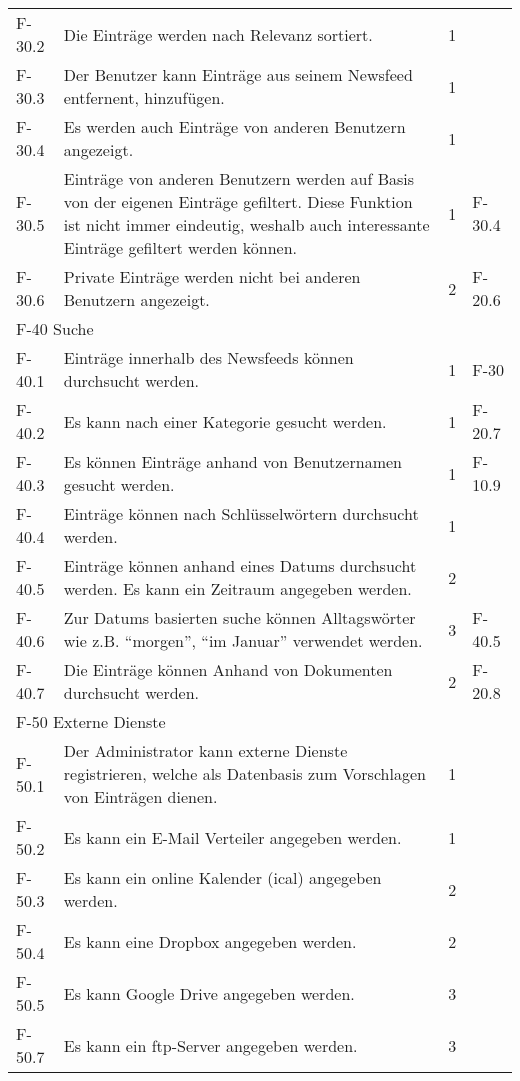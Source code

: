 \begin{tabularx}{\textwidth}{|l|X|l|l|}
    F-30.2 & Die Einträge werden nach Relevanz sortiert. & 1 & \\
    F-30.3 & Der Benutzer kann Einträge aus seinem Newsfeed entfernent, hinzufügen. & 1 & \\
    F-30.4 & Es werden auch Einträge von anderen Benutzern angezeigt. & 1 & \\
    F-30.5 & Einträge von anderen Benutzern werden auf Basis von der eigenen Einträge gefiltert. Diese Funktion ist nicht immer eindeutig, weshalb auch interessante Einträge gefiltert werden können. & 1 & F-30.4\\
    F-30.6 & Private Einträge werden nicht bei anderen Benutzern angezeigt. & 2 & F-20.6\\
    \hline
    \multicolumn{4}{|l|}{F-40 Suche}\\
    \hline
    F-40.1 & Einträge innerhalb des Newsfeeds können durchsucht werden. & 1 & F-30\\
    F-40.2 & Es kann nach einer Kategorie gesucht werden. & 1 & F-20.7\\
    F-40.3 & Es können Einträge anhand von Benutzernamen gesucht werden. & 1 & F-10.9\\
    F-40.4 & Einträge können nach Schlüsselwörtern durchsucht werden. & 1 & \\
    F-40.5 & Einträge können anhand eines Datums durchsucht werden. Es kann ein Zeitraum angegeben werden. & 2 & \\
    F-40.6 & Zur Datums basierten suche können Alltagswörter wie z.B. \enquote{morgen}, \enquote{im Januar} verwendet werden. & 3 & F-40.5\\
    F-40.7 & Die Einträge können Anhand von Dokumenten durchsucht werden. & 2 & F-20.8\\
    \hline
    \multicolumn{4}{|l|}{F-50 Externe Dienste}\\
    \hline
    F-50.1 & Der Administrator kann externe Dienste registrieren, welche als Datenbasis zum Vorschlagen von Einträgen dienen. & 1 & \\
    F-50.2 & Es kann ein E-Mail Verteiler angegeben werden. & 1 & \\
    F-50.3 & Es kann ein online Kalender (ical) angegeben werden. & 2 & \\
    F-50.4 & Es kann eine Dropbox angegeben werden. & 2 & \\
    F-50.5 & Es kann Google Drive angegeben werden. & 3 & \\
    F-50.7 & Es kann ein ftp-Server angegeben werden. & 3 & \\

\end{tabularx}
